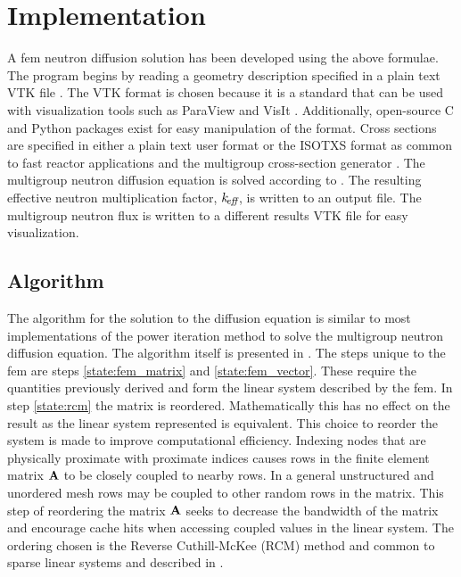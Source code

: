 \section{Implementation}
  A \gls{fem} neutron diffusion solution has been developed using 
  the above formulae. The program begins by reading a geometry description 
  specified in a plain text VTK file \cite{vtk}. The VTK format is chosen 
  because it is a standard that can be used with visualization tools such as 
  ParaView \cite{ParaView} and VisIt \cite{VisIt}. Additionally, open-source C 
  and Python packages exist for easy manipulation of the format. Cross sections
  are specified in either a plain text user format or the ISOTXS format as 
  common to fast reactor applications and the multigroup cross-section generator
  \mcc \cite{mcc}. The multigroup neutron diffusion equation is solved according
  to . The resulting effective neutron multiplication 
  factor, $k_{\!\mbox{\scriptsize \em eff}}$, is written to an output file. The multigroup neutron flux is
  written to a different results VTK file for easy visualization.

  \subsection{Algorithm}
    The algorithm for the solution to the diffusion equation is similar to most
    implementations of the power iteration method to solve the multigroup
    neutron diffusion equation. The algorithm itself is presented in 
    . The steps unique to the \gls{fem} are 
    steps \ref{state:fem_matrix} and \ref{state:fem_vector}. These require the 
    quantities previously derived and form the linear system described by the 
    \gls{fem}.  
    In step \ref{state:rcm} the matrix is reordered. Mathematically this has no
    effect on the result as the linear system represented is equivalent. This 
    choice to reorder the system is made to improve computational efficiency. 
    Indexing nodes that are physically proximate with proximate indices causes 
    rows in the finite element matrix $\mathbf{A}$ to be closely coupled to nearby
    rows. In a general unstructured and unordered mesh rows may be coupled to 
    other random rows in the matrix. This step of reordering the matrix $\mathbf{A}$ 
    seeks to decrease the bandwidth of the matrix and encourage cache hits when
    accessing coupled values in the linear system. The ordering chosen is the
    Reverse Cuthill-McKee (RCM) method and common to sparse linear systems and 
    described in \cite{rcm}.
    

